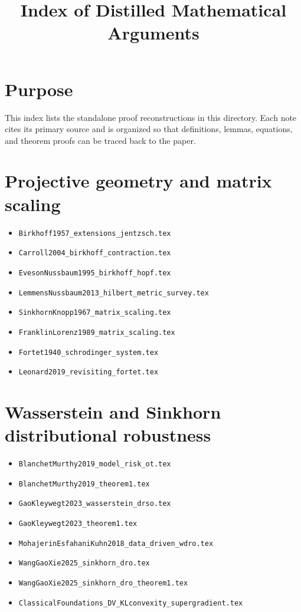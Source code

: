 
\title{Index of Distilled Mathematical Arguments}
\author{}
\date{}

\maketitle

\section*{Purpose}
This index lists the standalone proof reconstructions in this directory.  Each note cites its primary source and is organized so that definitions, lemmas, equations, and theorem proofs can be traced back to the paper.

\section*{Projective geometry and matrix scaling}
\begin{itemize}
\item \texttt{Birkhoff1957\_extensions\_jentzsch.tex}
\item \texttt{Carroll2004\_birkhoff\_contraction.tex}
\item \texttt{EvesonNussbaum1995\_birkhoff\_hopf.tex}
\item \texttt{LemmensNussbaum2013\_hilbert\_metric\_survey.tex}
\item \texttt{SinkhornKnopp1967\_matrix\_scaling.tex}
\item \texttt{FranklinLorenz1989\_matrix\_scaling.tex}
\item \texttt{Fortet1940\_schrodinger\_system.tex}
\item \texttt{Leonard2019\_revisiting\_fortet.tex}
\end{itemize}

\section*{Wasserstein and Sinkhorn distributional robustness}
\begin{itemize}
\item \texttt{BlanchetMurthy2019\_model\_risk\_ot.tex}
\item \texttt{BlanchetMurthy2019\_theorem1.tex}
\item \texttt{GaoKleywegt2023\_wasserstein\_drso.tex}
\item \texttt{GaoKleywegt2023\_theorem1.tex}
\item \texttt{MohajerinEsfahaniKuhn2018\_data\_driven\_wdro.tex}
\item \texttt{WangGaoXie2025\_sinkhorn\_dro.tex}
\item \texttt{WangGaoXie2025\_sinkhorn\_dro\_theorem1.tex}
\item \texttt{ClassicalFoundations\_DV\_KLconvexity\_supergradient.tex}
\end{itemize}

